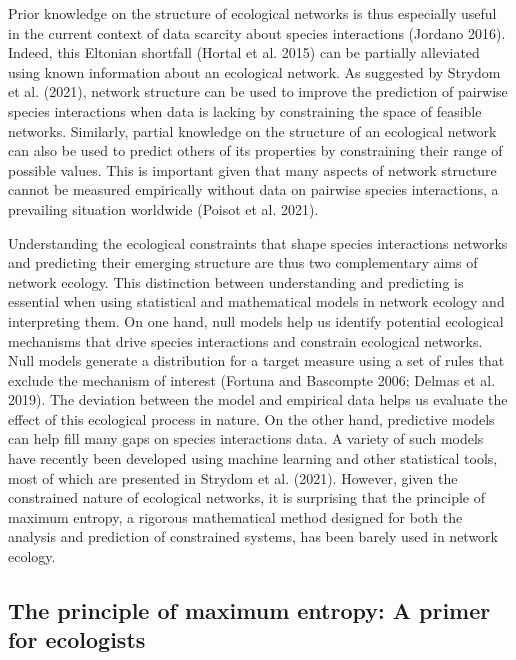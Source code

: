 \documentclass[11pt]{article}
\begin{document}
Prior knowledge on the structure of ecological networks is thus
especially useful in the current context of data scarcity about species
interactions (Jordano 2016). Indeed, this Eltonian shortfall (Hortal et
al. 2015) can be partially alleviated using known information about an
ecological network. As suggested by Strydom et al. (2021), network
structure can be used to improve the prediction of pairwise species
interactions when data is lacking by constraining the space of feasible
networks. Similarly, partial knowledge on the structure of an ecological
network can also be used to predict others of its properties by
constraining their range of possible values. This is important given
that many aspects of network structure cannot be measured empirically
without data on pairwise species interactions, a prevailing situation
worldwide (Poisot et al. 2021).

Understanding the ecological constraints that shape species interactions
networks and predicting their emerging structure are thus two
complementary aims of network ecology. This distinction between
understanding and predicting is essential when using statistical and
mathematical models in network ecology and interpreting them. On one
hand, null models help us identify potential ecological mechanisms that
drive species interactions and constrain ecological networks. Null
models generate a distribution for a target measure using a set of rules
that exclude the mechanism of interest (Fortuna and Bascompte 2006;
Delmas et al. 2019). The deviation between the model and empirical data
helps us evaluate the effect of this ecological process in nature. On
the other hand, predictive models can help fill many gaps on species
interactions data. A variety of such models have recently been developed
using machine learning and other statistical tools, most of which are
presented in Strydom et al. (2021). However, given the constrained
nature of ecological networks, it is surprising that the principle of
maximum entropy, a rigorous mathematical method designed for both the
analysis and prediction of constrained systems, has been barely used in
network ecology.

\hypertarget{the-principle-of-maximum-entropy-a-primer-for-ecologists}{%
\subsection{The principle of maximum entropy: A primer for
ecologists}\label{the-principle-of-maximum-entropy-a-primer-for-ecologists}}
\end{document}
